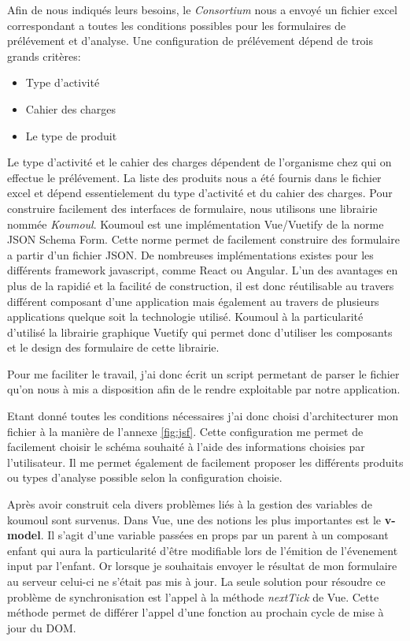 Afin de nous indiqués leurs besoins, le \textit{Consortium} nous a envoyé un fichier excel correspondant a toutes les conditions possibles pour les formulaires de prélévement et d'analyse. 
Une configuration de prélévement dépend de trois grands critères: 
\begin{itemize}
    \item Type d'activité
    \item Cahier des charges
    \item Le type de produit
\end{itemize}
Le type d'activité et le cahier des charges dépendent de l'organisme chez qui on effectue le prélévement. La liste des produits nous a été fournis dans le fichier excel et dépend essentielement du type d'activité et du cahier des charges. Pour construire facilement des interfaces de formulaire, nous utilisons une librairie nommée \textit{Koumoul}\cite{koumoul}. Koumoul est une implémentation Vue/Vuetify de la norme JSON Schema Form\cite{jsf}. Cette norme permet de facilement construire des formulaire a partir d'un fichier JSON. De nombreuses implémentations existes pour les différents framework javascript, comme React\cite{react} ou Angular\cite{angular}. L'un des avantages en plus de la rapidié et la facilité de construction, il est donc réutilisable au travers différent composant d'une application mais également au travers de plusieurs applications quelque soit la technologie utilisé. Koumoul à la particularité d'utilisé la librairie graphique Vuetify qui permet donc d'utiliser les composants et le design des formulaire de cette librairie.

Pour me faciliter le travail, j'ai donc écrit un script permetant de parser le fichier qu'on nous à mis a disposition afin de le rendre exploitable par notre application. 

Etant donné toutes les conditions nécessaires j'ai donc choisi d'architecturer mon fichier à la manière de l'annexe \ref{fig:jsf}. Cette configuration me permet de facilement choisir le schéma souhaité à l'aide des informations choisies par l'utilisateur. Il me permet également de facilement proposer les différents produits ou types d'analyse possible selon la configuration choisie.

Après avoir construit cela divers problèmes liés à la gestion des variables de koumoul sont survenus. Dans Vue, une des notions les plus importantes est le \textbf{v-model}\cite{vmodel}. Il s'agit d'une variable passées en props par un parent à un composant enfant qui aura la particularité d'être modifiable lors de l'émition de l'évenement input par l'enfant. Or lorsque je souhaitais envoyer le résultat de mon formulaire au serveur celui-ci ne s'était pas mis à jour. La seule solution pour résoudre ce problème de synchronisation est l'appel à la méthode \textit{nextTick}\cite{nextTick} de Vue. Cette méthode permet de différer l'appel d'une fonction au prochain cycle de mise à jour du DOM.


